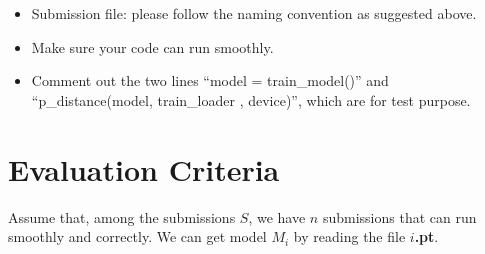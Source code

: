 \begin{itemize}
    \item Submission file: please follow the naming convention as suggested above. 
    \item Make sure your code can run smoothly. 
    \item Comment out the two lines ``model = train\_model()'' and ``p\_distance(model, train\_loader , device)'', which are for test purpose. 
\end{itemize}



\section{Evaluation Criteria}

Assume that, among the submissions $S$, we have $n$ submissions that can run smoothly and correctly. We can get model $M_i$ by reading the file \textbf{$i$.pt}. 

